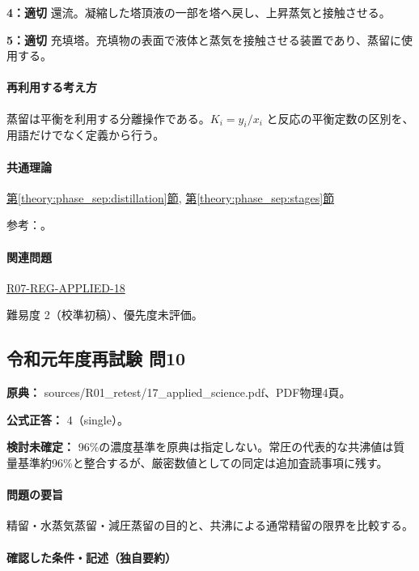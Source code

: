 \noindent\textbf{4：適切} 還流。凝縮した塔頂液の一部を塔へ戻し、上昇蒸気と接触させる。\par

\noindent\textbf{5：適切} 充填塔。充填物の表面で液体と蒸気を接触させる装置であり、蒸留に使用する。\par

\paragraph{再利用する考え方} 蒸留は平衡を利用する分離操作である。\(K_i=y_i/x_i\) と反応の平衡定数の区別を、用語だけでなく定義から行う。

\paragraph{共通理論} \hyperref[theory:phase_sep:distillation]{第\ref*{theory:phase_sep:distillation}節}, \hyperref[theory:phase_sep:stages]{第\ref*{theory:phase_sep:stages}節}

\par 参考：\cite{nptel_distillation1}。

\paragraph{関連問題} \hyperref[q:r07-reg-applied-18]{R07-REG-APPLIED-18}

\par 難易度 2（校準初稿）、優先度未評価。

\subsection{令和元年度再試験 問10}
\label{q:r01-ret-applied-10}

\noindent\textbf{原典：} sources/R01\_retest/17\_applied\_science.pdf、PDF物理4頁。

\textbf{公式正答：} 4（single）。

\par\textbf{検討未確定：} 96\%の濃度基準を原典は指定しない。常圧の代表的な共沸値は質量基準約96\%と整合するが、厳密数値としての同定は追加査読事項に残す。

\paragraph{問題の要旨} 精留・水蒸気蒸留・減圧蒸留の目的と、共沸による通常精留の限界を比較する。

\paragraph{確認した条件・記述（独自要約）}\mbox{}\par

